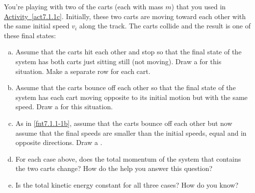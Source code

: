 \label{fnt7.1.1-1}

You're playing with two of the carts (each with mass $m$) that you used in \hyperref[act7.1.1c]{Activity~\ref*{act7.1.1c}}. Initially, these two carts are moving toward each other with the same initial speed $v_i$ along the track. The carts collide and the result is one of these final states:
\begin{enumerate}[(a)]
	\item Assume that the carts hit each other and stop so that the final state of the system has both carts just sitting still (not moving). Draw a \pchart{} for this situation. Make a separate row for each cart.%
	\item Assume that the carts bounce off each other so that the final state of the system has each cart moving opposite to its initial motion but with the same speed. Draw a \pchart{} for this situation.
	\label{fnt7.1.1-1b}
	\item As in \eqref{fnt7.1.1-1b}, assume that the carts bounce off each other but now assume that the final speeds are smaller than the initial speeds, equal and in opposite directions. Draw a \pchart{}.
	\item For each case above, does the total momentum of the system that contains the two carts change? How do the \pcharts{} help you answer this question?
	\item Is the total kinetic energy constant for all three cases? How do you know?
\end{enumerate}
